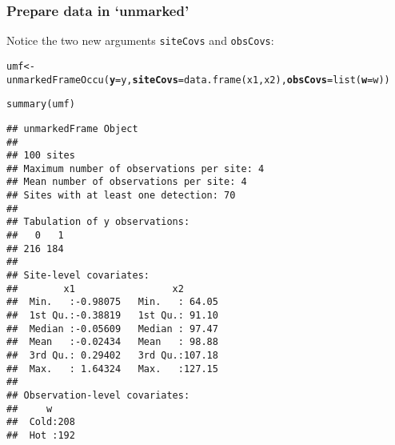 \documentclass[color=usenames,dvipsnames]{beamer}\usepackage[]{graphicx}\usepackage[]{color}
\makeatletter
\newcommand{\hlstd}[1]{\textcolor[rgb]{0,0,0}{#1}}%
\newcommand{\hlkwb}[1]{\textcolor[rgb]{0,0.341,0.682}{#1}}%
\newcommand{\hlkwc}[1]{\textcolor[rgb]{0,0,0}{\textbf{#1}}}%
\newcommand{\hlkwd}[1]{\textcolor[rgb]{0.004,0.004,0.506}{#1}}%
\newenvironment{kframe}{%
 \def\at@end@of@kframe{}%
 \ifinner\ifhmode%
  \def\at@end@of@kframe{\end{minipage}}%
  \begin{minipage}{\columnwidth}%
 \fi\fi%
 \def\FrameCommand##1{\hskip\@totalleftmargin \hskip-\fboxsep
 \colorbox{shadecolor}{##1}\hskip-\fboxsep
     \hskip-\linewidth \hskip-\@totalleftmargin \hskip\columnwidth}%
 \MakeFramed {\advance\hsize-\width
   \@totalleftmargin\z@ \linewidth\hsize
   \@setminipage}}%
 {\par\unskip\endMakeFramed%
 \at@end@of@kframe}
\newenvironment{knitrout}{}{} %
\newcommand{\inr}[1]{\colorbox{inlinecolor}{\texttt{#1}}}
\makeatother
\begin{document}
\begin{frame}[fragile]
  \frametitle{Prepare data in `unmarked'}
  \small
Notice the two new arguments \inr{siteCovs} and \inr{obsCovs}: 
\begin{knitrout}\tiny
{}\color{fgcolor}\begin{kframe}
\begin{alltt}
\hlstd{umf} \hlkwb{<-} \hlkwd{unmarkedFrameOccu}\hlstd{(}\hlkwc{y}\hlstd{=y,} \hlkwc{siteCovs}\hlstd{=}\hlkwd{data.frame}\hlstd{(x1,x2),} \hlkwc{obsCovs}\hlstd{=}\hlkwd{list}\hlstd{(}\hlkwc{w}\hlstd{=w))}
\end{alltt}


{\ttfamily\noindent\color{warningcolor}{\#\# Warning: obsCovs contains characters. Converting them to factors.}}\end{kframe}
\end{knitrout}
\pause
\begin{knitrout}\tiny
{}\color{fgcolor}\begin{kframe}
\begin{alltt}
\hlkwd{summary}\hlstd{(umf)}
\end{alltt}
\begin{verbatim}
## unmarkedFrame Object
## 
## 100 sites
## Maximum number of observations per site: 4 
## Mean number of observations per site: 4 
## Sites with at least one detection: 70 
## 
## Tabulation of y observations:
##   0   1 
## 216 184 
## 
## Site-level covariates:
##        x1                 x2        
##  Min.   :-0.98075   Min.   : 64.05  
##  1st Qu.:-0.38819   1st Qu.: 91.10  
##  Median :-0.05609   Median : 97.47  
##  Mean   :-0.02434   Mean   : 98.88  
##  3rd Qu.: 0.29402   3rd Qu.:107.18  
##  Max.   : 1.64324   Max.   :127.15  
## 
## Observation-level covariates:
##     w      
##  Cold:208  
##  Hot :192
\end{verbatim}
\end{kframe}
\end{knitrout}
\end{frame}
\end{document}
